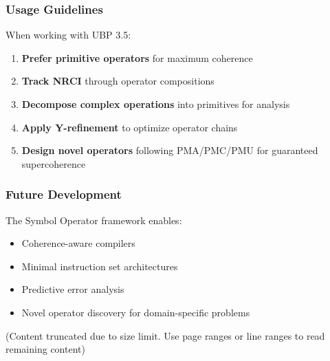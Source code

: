 \subsubsection{Usage Guidelines}

When working with UBP 3.5:

\begin{enumerate}
    \item \textbf{Prefer primitive operators} for maximum coherence
    \item \textbf{Track NRCI} through operator compositions
    \item \textbf{Decompose complex operations} into primitives for analysis
    \item \textbf{Apply Y-refinement} to optimize operator chains
    \item \textbf{Design novel operators} following PMA/PMC/PMU for guaranteed supercoherence
\end{enumerate}

\subsubsection{Future Development}

The Symbol Operator framework enables:

\begin{itemize}
    \item Coherence-aware compilers
    \item Minimal instruction set architectures
    \item Predictive error analysis
    \item Novel operator discovery for domain-specific problems
\end{itemize}

(Content truncated due to size limit. Use page ranges or line ranges to read remaining content)